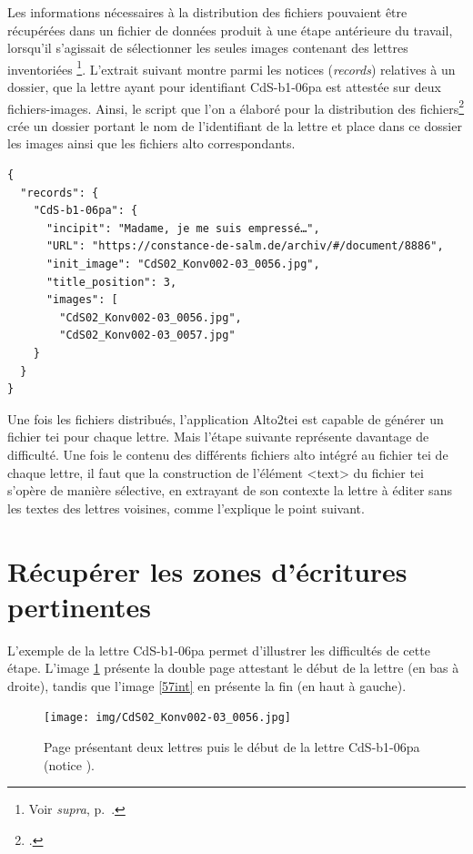 \documentclass[a4paper,12pt,twoside]{book}
\begin{document}
			Les informations nécessaires à la distribution des fichiers pouvaient être récupérées dans un fichier de données produit à une étape antérieure du travail, lorsqu'il s'agissait de sélectionner les seules images contenant des lettres inventoriées%
			\footnote{Voir \textit{supra}, p.~\pageref{donnees-images}.}. L'extrait suivant montre parmi les notices (\textit{records}) relatives à un dossier, que la lettre ayant pour identifiant \textsf{CdS-b1-06pa} est attestée sur deux fichiers-images. Ainsi, le script que l'on a élaboré pour la distribution des fichiers\footcite{biayDistributionFichiersPy2022} crée un dossier portant le nom de l'identifiant de la lettre et place dans ce dossier les images ainsi que les fichiers \gls{alto} correspondants.
			
			\label{json-CdS-b1-06pa}
			\begin{verbatim}
{
  "records": {
    "CdS-b1-06pa": {
      "incipit": "Madame, je me suis empressé…",
      "URL": "https://constance-de-salm.de/archiv/#/document/8886",
      "init_image": "CdS02_Konv002-03_0056.jpg",
      "title_position": 3,
      "images": [
        "CdS02_Konv002-03_0056.jpg",
        "CdS02_Konv002-03_0057.jpg"
    }
  }
}
			\end{verbatim}
			
			Une fois les fichiers distribués, l'application Alto2tei est capable de générer un fichier \gls{tei} pour chaque lettre. Mais l'étape suivante représente davantage de difficulté. Une fois le contenu des différents fichiers \gls{alto} intégré au fichier \gls{tei} de chaque lettre, il faut que la construction de l'élément \textsf{<text>} du fichier \gls{tei} s'opère de manière sélective, en extrayant de son contexte la lettre à éditer sans les textes des lettres voisines, comme l'explique le point suivant.
			
		\section{Récupérer les zones d'écritures pertinentes}
		
			L'exemple de la lettre \textsf{CdS-b1-06pa} permet d'illustrer les difficultés de cette étape. L'image \ref{56int} présente la double page attestant le début de la lettre (en bas à droite), tandis que l'image \ref{57int} en présente la fin (en haut à gauche).
			
			\begin{figure}[!h]
				\centering
				\texttt{[image: img/CdS02\_Konv002-03\_0056.jpg]}
				\caption{Page présentant deux lettres puis le début de la lettre \textsf{CdS-b1-06pa} (notice \cite{CdS02056057}).}
				\label{56int}
			\end{figure}
\end{document}
